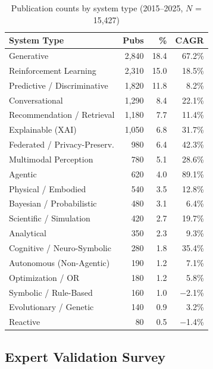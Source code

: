 \documentclass[acmsmall,screen,review]{acmart}
\begin{document}
\begin{table}[ht]
  \caption{Publication counts by system type (2015--2025, $N$ = 15,427)}
  \label{tab:publications}
  \begin{tabular}{lrrr}
    \toprule
    \textbf{System Type} & \textbf{Pubs} & \textbf{\%} & \textbf{CAGR} \\
    \midrule
    Generative & 2,840 & 18.4 & 67.2\% \\
    Reinforcement Learning & 2,310 & 15.0 & 18.5\% \\
    Predictive / Discriminative & 1,820 & 11.8 & 8.2\% \\
    Conversational & 1,290 & 8.4 & 22.1\% \\
    Recommendation / Retrieval & 1,180 & 7.7 & 11.4\% \\
    Explainable (XAI) & 1,050 & 6.8 & 31.7\% \\
    Federated / Privacy-Preserv. & 980 & 6.4 & 42.3\% \\
    Multimodal Perception & 780 & 5.1 & 28.6\% \\
    Agentic & 620 & 4.0 & 89.1\% \\
    Physical / Embodied & 540 & 3.5 & 12.8\% \\
    Bayesian / Probabilistic & 480 & 3.1 & 6.4\% \\
    Scientific / Simulation & 420 & 2.7 & 19.7\% \\
    Analytical & 350 & 2.3 & 9.3\% \\
    Cognitive / Neuro-Symbolic & 280 & 1.8 & 35.4\% \\
    Autonomous (Non-Agentic) & 190 & 1.2 & 7.1\% \\
    Optimization / OR & 180 & 1.2 & 5.8\% \\
    Symbolic / Rule-Based & 160 & 1.0 & $-$2.1\% \\
    Evolutionary / Genetic & 140 & 0.9 & 3.2\% \\
    Reactive & 80 & 0.5 & $-$1.4\% \\
    \bottomrule
  \end{tabular}
\end{table}

\subsection{Expert Validation Survey}
\end{document}

